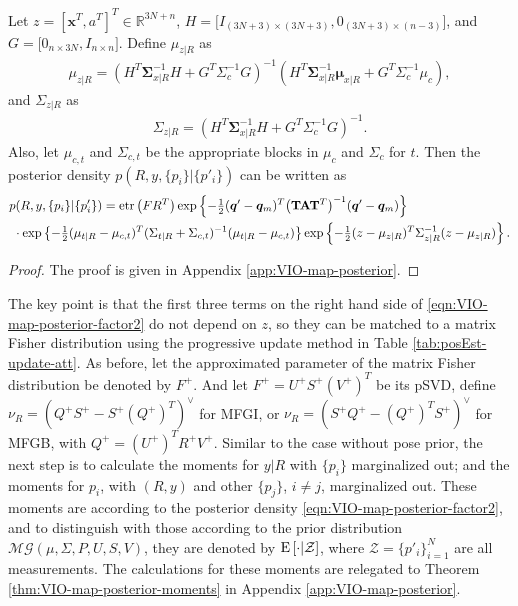 \begin{theorem} \label{thm:VIO-map-posterior}
	Let $z = [\bm{x}^T, a^T]^T \in \mathbb{R}^{3N+n}$, $H = \big[ I_{(3N+3)\times (3N+3)}, 0_{(3N+3)\times (n-3)} \big]$, and $G = \big[ 0_{n\times 3N}, I_{n\times n} \big]$.
	Define $\mu_{z|R}$ as
	\begin{align}
		\mu_{z|R} = \left( H^T\bm{\Sigma}_{x|R}^{-1}H + G^T\Sigma_c^{-1}G \right)^{-1} \left( H^T\bm{\Sigma}_{x|R}^{-1}\bm{\mu}_{x|R} + G^T\Sigma_c^{-1}\mu_c \right),
	\end{align}
	and $\Sigma_{z|R}$ as
	\begin{align}
		\Sigma_{z|R} = \left( H^T\bm{\Sigma}_{x|R}^{-1}H + G^T\Sigma_c^{-1}G \right)^{-1}.
	\end{align}
	Also, let $\mu_{c,t}$ and $\Sigma_{c,t}$ be the appropriate blocks in $\mu_c$ and $\Sigma_c$ for $t$.
	Then the posterior density $p(R,y,\{p_i\}|\{p'_i\})$ can be written as
	\begin{align} \label{eqn:VIO-map-posterior-factor2}
		&p(R,y,\{p_i\}|\{p'_i\}) = \mathrm{etr}\left( FR^T \right) \exp\left\{ -\tfrac{1}{2} (\bm{q}'-\bm{q}_m)^T \big(\mathbf{T}\mathbf{A}\mathbf{T}^T\big)^{-1} (\bm{q}'-\bm{q}_m) \right\} \nonumber \\
		&\ \cdot \exp\left\{ -\tfrac{1}{2}(\mu_{t|R}-\mu_{c,t})^T (\Sigma_{t|R} + \Sigma_{c,t})^{-1} (\mu_{t|R}-\mu_{c,t}) \right\} \exp\left\{ -\tfrac{1}{2}(z-\mu_{z|R})^T \Sigma_{z|R}^{-1} (z-\mu_{z|R}) \right\}.
	\end{align}
\end{theorem}
\begin{proof}
	The proof is given in Appendix \ref{app:VIO-map-posterior}.
\end{proof}

The key point is that the first three terms on the right hand side of \eqref{eqn:VIO-map-posterior-factor2} do not depend on $z$, so they can be matched to a matrix Fisher distribution using the progressive update method in Table \ref{tab:posEst-update-att}.
As before, let the approximated parameter of the matrix Fisher distribution be denoted by $F^+$.
And let $F^+ = U^+S^+(V^+)^T$ be its pSVD, define $\nu_R = (Q^+S^+-S^+(Q^+)^T)^\vee$ for MFGI, or $\nu_R = (S^+Q^+-(Q^+)^TS^+)^\vee$ for MFGB, with $Q^+ = (U^+)^TR^+V^+$.
Similar to the case without pose prior, the next step is to calculate the moments for $y|R$ with $\{p_i\}$ marginalized out; and the moments for $p_i$, with $(R,y)$ and other $\{p_j\}$, $i\neq j$, marginalized out.
These moments are according to the posterior density \eqref{eqn:VIO-map-posterior-factor2}, and to distinguish with those according to the prior distribution $\mathcal{MG}(\mu,\Sigma,P,U,S,V)$, they are denoted by $\mathrm{E}\left[ \cdot | \mathcal{Z} \right]$, where $\mathcal{Z} = \{p'_i\}_{i=1}^N$ are all measurements.
The calculations for these moments are relegated to Theorem \ref{thm:VIO-map-posterior-moments} in Appendix \ref{app:VIO-map-posterior}.

